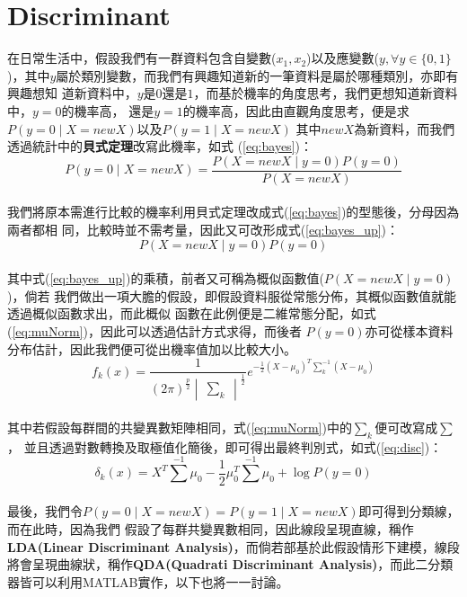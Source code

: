 	\section{Discriminant}
		在日常生活中，假設我們有一群資料包含自變數($x_1,x_2$)以及應變數($y,\forall y \in \{ 			0,1\}$)，其中$y$屬於類別變數，而我們有興趣知道新的一筆資料是屬於哪種類別，亦即有興趣想知			道新資料中，$y$是$0$還是$1$，而基於機率的角度思考，我們更想知道新資料中，$y=0$的機率高，			還是$y=1$的機率高，因此由直觀角度思考，便是求$P(y=0 \mid X=newX)$以及$P(y=1 \mid 				X=newX)$ 其中$newX$為新資料，而我們透過統計中的\textbf{貝式定理}改寫此機率，如式				(\ref{eq:bayes})：
 		\bigskip
		\begin{equation}\label{eq:bayes} 						
 			P(y=0 \mid X=newX) = \frac{P(X=newX \mid y=0)P(y=0)}{P(X=newX)}
 		\end{equation}
 		\\
 		我們將原本需進行比較的機率利用貝式定理改成式(\ref{eq:bayes})的型態後，分母因為兩者都相			同，比較時並不需考量，因此又可改形成式(\ref{eq:bayes_up})：
 		\bigskip
 		\begin{equation}\label{eq:bayes_up} 						
 			P(X=newX \mid y=0)P(y=0)
 		\end{equation}
 		\\
		其中式(\ref{eq:bayes_up})的乘積，前者又可稱為概似函數值($P(X=newX \mid y=0)$)，倘若			我們做出一項大膽的假設，即假設資料服從常態分佈，其概似函數值就能透過概似函數求出，而此概似			函數在此例便是二維常態分配，如式(\ref{eq:muNorm})，因此可以透過估計方式求得，而後者				$P(y=0)$亦可從樣本資料分布估計，因此我們便可從出機率值加以比較大小。
 		\bigskip
		\begin{equation}\label{eq:muNorm} 						
 			f_k(x) = \frac{1}{(2 \pi )^{\frac{p}{2} } \begin{vmatrix}
 			\sum_k
 			\end{vmatrix}^{\frac{1}{2}}}
 			e^{-\frac{1}{2} (X-\mu_0)^{T} \sum_k^{-1} (X-\mu_0) }
 		\end{equation}
 		\\
		其中若假設每群間的共變異數矩陣相同，式(\ref{eq:muNorm})中的$\sum_k$便可改寫成$\sum$，			並且透過對數轉換及取極值化簡後，即可得出最終判別式，如式(\ref{eq:disc})：
		\bigskip
		\begin{equation}\label{eq:disc} 						
 			\delta_k(x)= X^{T} {\sum}^{-1} \mu_0 - \frac{1}{2}\mu_0^{T} {\sum} ^{-1} 				\mu_0 +\log{P(y=0)}
 		\end{equation}
 		\\
 		最後，我們令$P(y=0 \mid X=newX)=P(y=1 \mid X=newX)$即可得到分類線，而在此時，因為我們			假設了每群共變異數相同，因此線段呈現直線，稱作\textbf{LDA(Linear Discriminant 					Analysis)}，而倘若部基於此假設情形下建模，線段將會呈現曲線狀，稱作\textbf{QDA(Quadrati  		Discriminant Analysis)}，而此二分類器皆可以利用MATLAB實作，以下也將一一討論。
